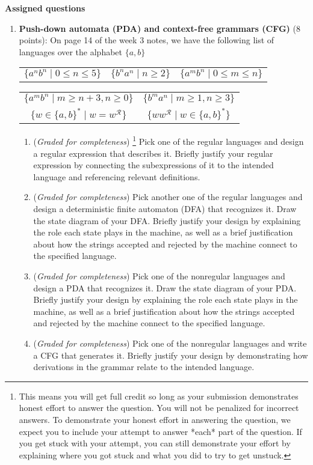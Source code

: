 \documentclass[12pt, oneside]{article}
\newcommand{\gradeComplete}{({\it Graded for completeness}) }
\newcommand{\gradeCompleteFirst}{\gradeComplete\footnote{This means you will 
get full credit so long as your submission demonstrates honest effort to 
answer the question. You will not be penalized for incorrect answers. 
To demonstrate your honest effort in answering the question, we 
expect you to include your attempt to answer *each* part of the question. 
If you get stuck with your attempt, you can still demonstrate 
your effort by explaining where you got stuck and what 
you did to try to get unstuck.} }
\begin{document}
{\bf Assigned questions}
\begin{enumerate}[wide, labelwidth=!, labelindent=0pt]

\item \textbf{Push-down automata (PDA) and context-free grammars (CFG)} (8 points): 
On page 14 of the week 3 notes, we have the following list of languages over the alphabet $\{a,b\}$

\begin{center}
\begin{tabular}{ccc}
    $\{a^nb^n \mid 0  \leq n  \leq 5 \}$
    &$\{b^n a^n \mid  n  \geq 2\}$
    &$\{a^m b^n \mid  0 \leq m\leq n\}$
\end{tabular}
\begin{tabular}{cc}
    $\{a^m b^n \mid  m \geq n+3,  n \geq 0\}$
    &$\{b^m a^n \mid  m \geq 1, n \geq  3\}$\\
    $\{ w  \in \{a,b\}^* \mid w = w^\mathcal{R} \}$
    &$\{ ww^\mathcal{R} \mid w\in \{a,b\}^* \}$ \\
\end{tabular}
\end{center}
\begin{enumerate}
    \item\gradeCompleteFirst Pick one of the regular languages and design a regular expression that describes it. 
    Briefly justify your regular expression by connecting
    the subexpressions of it to the intended language and referencing relevant definitions.
    \item\gradeComplete Pick another one of the regular languages and design a deterministic finite automaton (DFA) that recognizes it. Draw the 
    state diagram of your DFA. Briefly justify your design by explaining the role each state plays in the machine, 
    as well as a brief 
    justification about how the strings accepted and rejected by the machine connect to the specified language.
    \item\gradeComplete Pick one of the nonregular languages and design a PDA that recognizes it. Draw the state diagram of 
    your PDA. Briefly justify your design by explaining the role each state plays in the machine, 
    as well as a brief 
    justification about how the strings accepted and rejected by the machine connect to the specified language.
    \item\gradeComplete Pick one of the nonregular languages and write a CFG that generates it. Briefly justify
    your design by demonstrating how derivations in the grammar relate
    to the intended language.
\end{enumerate}


\end{enumerate}
\end{document}
